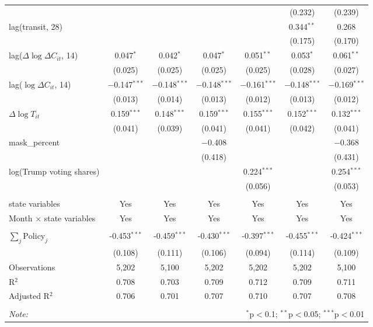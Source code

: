 \begin{tabular}{@{\extracolsep{1pt}}lcccccc}
  &  &  &  &  & (0.232) & (0.239) \\ 
  lag(transit, 28) &  &  &  &  & 0.344$^{**}$ & 0.268 \\ 
  &  &  &  &  & (0.175) & (0.170) \\ 
  lag($\Delta \log \Delta C_{it}$, 14) & 0.047$^{*}$ & 0.042$^{*}$ & 0.047$^{*}$ & 0.051$^{**}$ & 0.053$^{*}$ & 0.061$^{**}$ \\ 
  & (0.025) & (0.025) & (0.025) & (0.025) & (0.028) & (0.027) \\ 
  lag($\log \Delta C_{it}$, 14) & $-$0.147$^{***}$ & $-$0.148$^{***}$ & $-$0.148$^{***}$ & $-$0.161$^{***}$ & $-$0.148$^{***}$ & $-$0.169$^{***}$ \\ 
  & (0.013) & (0.014) & (0.013) & (0.012) & (0.013) & (0.012) \\ 
  $\Delta \log T_{it}$ & 0.159$^{***}$ & 0.148$^{***}$ & 0.159$^{***}$ & 0.155$^{***}$ & 0.152$^{***}$ & 0.132$^{***}$ \\ 
  & (0.041) & (0.039) & (0.041) & (0.041) & (0.042) & (0.041) \\ 
  mask\_percent &  &  & $-$0.408 &  &  & $-$0.368 \\ 
  &  &  & (0.418) &  &  & (0.431) \\ 
  log(Trump voting shares) &  &  &  & 0.224$^{***}$ &  & 0.254$^{***}$ \\ 
  &  &  &  & (0.056) &  & (0.053) \\ 
 \hline \\[-1.8ex] 
state variables & Yes & Yes & Yes & Yes & Yes & Yes \\ 
Month $\times$ state variables & Yes & Yes & Yes & Yes & Yes & Yes \\ 
\hline \\[-1.8ex] 
$\sum_j \mathrm{Policy}_j$ & -0.453$^{***}$ & -0.459$^{***}$ & -0.430$^{***}$ & -0.397$^{***}$ & -0.455$^{***}$ & -0.424$^{***}$ \\ 
 & (0.108) & (0.111) & (0.106) & (0.094) & (0.114) & (0.109) \\ 
Observations & 5,202 & 5,100 & 5,202 & 5,202 & 5,202 & 5,100 \\ 
R$^{2}$ & 0.708 & 0.703 & 0.709 & 0.712 & 0.709 & 0.711 \\ 
Adjusted R$^{2}$ & 0.706 & 0.701 & 0.707 & 0.710 & 0.707 & 0.708 \\ 
\hline 
\hline \\[-1.8ex] 
\textit{Note:}  & \multicolumn{6}{r}{$^{*}$p$<$0.1; $^{**}$p$<$0.05; $^{***}$p$<$0.01} \\ 
\end{tabular} 
